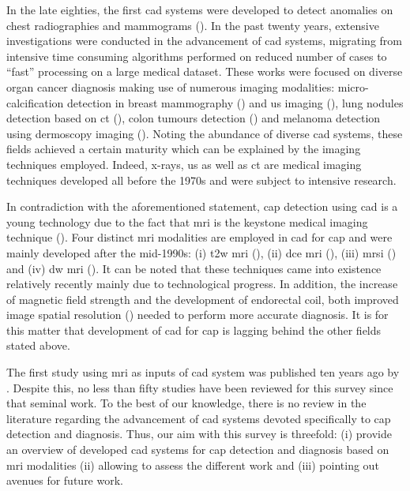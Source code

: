 In the late eighties, the first \acs{cad} systems were developed to detect anomalies on chest radiographies and mammograms (\cite{Doi1987,Chan1987,Giger1988}). In the past twenty years, extensive investigations were conducted in the advancement of \acs{cad} systems, migrating from intensive time consuming algorithms performed on reduced number of cases to ``fast'' processing on a large medical dataset. These works were focused on diverse organ cancer diagnosis making use of numerous imaging modalities: micro-calcification detection in breast mammography (\cite{Rangayyan2007,Elter2009}) and \ac{us} imaging (\cite{Cheng2010}), lung nodules detection based on \ac{ct} (\cite{Chan2008,Suzuki2012}), colon tumours detection (\cite{Suzuki2012}) and melanoma detection using dermoscopy imaging (\cite{Korotkov2012}). Noting the abundance of diverse \acs{cad} systems, these fields achieved a certain maturity which can be explained by the imaging techniques employed. Indeed, x-rays, \ac{us} as well as \ac{ct} are medical imaging techniques developed all before the 1970s and were subject to intensive research.

In contradiction with the aforementioned statement, \ac{cap} detection using \acs{cad} is a young technology due to the fact that \ac{mri} is the keystone medical imaging technique (\cite{Hegde2013}). Four distinct \ac{mri} modalities are employed in \acs{cad} for \ac{cap} and were mainly developed after the mid-1990s: (i) \ac{t2w} \ac{mri} (\cite{Hricak1983}), (ii) \ac{dce} \ac{mri} (\cite{HuchBoni1995}), (iii) \ac{mrsi} (\cite{Kurhanewicz1996}) and (iv) \ac{dw} \ac{mri} (\cite{Scheidler1999}). It can be noted that these techniques came into existence relatively recently mainly due to technological progress. In addition, the increase of magnetic field strength and the development of endorectal coil, both improved image spatial resolution (\cite{Swanson2001}) needed to perform more accurate diagnosis. It is for this matter that development of \acs{cad} for \ac{cap} is lagging behind the other fields stated above.

The first study using \ac{mri} as inputs of \acs{cad} system was published ten years ago by \cite{Chan2003}. Despite this, no less than fifty studies have been reviewed for this survey since that seminal work. To the best of our knowledge, there is no review in the literature regarding the advancement of \acs{cad} systems devoted specifically to \ac{cap} detection and diagnosis. Thus, our aim with this survey is threefold: (i) provide an overview of developed \acs{cad} systems for \ac{cap} detection and diagnosis based on \ac{mri} modalities (ii) allowing to assess the different work and (iii) pointing out avenues for future work.

